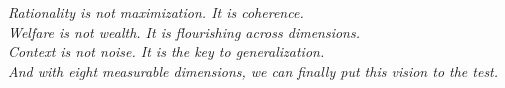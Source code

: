 \vspace{1em}
\begin{center}
\emph{Rationality is not maximization. It is coherence.} \\
\emph{Welfare is not wealth. It is flourishing across dimensions.} \\
\emph{Context is not noise. It is the key to generalization.} \\[0.5em]
\emph{And with eight measurable dimensions, we can finally put this vision to the test.}
\end{center}
